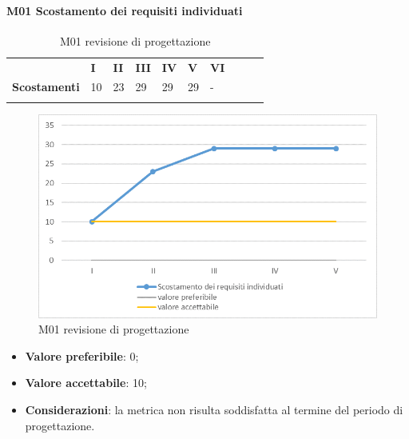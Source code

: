 \paragraph{M01 Scostamento dei requisiti individuati} \mbox{}
\begin{longtable}[H!] {						
		>{}p{50mm}  		
		>{}p{8mm}
		>{}p{8mm}		
		>{}p{8mm}		
		>{}p{8mm}		
		>{}p{8mm}		
		>{}p{8mm}
		>{}p{8mm}
		>{}p{8mm}
		>{}p{8mm}
	}
\rowcolor{gray!50}
\textbf{} & \textbf{I} & \textbf{II} & \textbf{III} & \textbf{IV} & \textbf{V} & \textbf{VI} \TBstrut \\ [2mm]
\textbf{Scostamenti} & 10 & 23 & 29 & 29 & 29 & - \TBstrut \\ [2mm]
	\rowcolor{white}
\caption{M01 revisione di progettazione}
\end{longtable}
\begin{figure}[H] 	
\includegraphics[width=\linewidth]{./img/grafici/RP1.png}	
\caption{M01 revisione di progettazione}	
\end{figure}
\begin{itemize}
	\item \textbf{Valore preferibile}: 0;
	\item \textbf{Valore accettabile}: 10;
	\item \textbf{Considerazioni}: la metrica non risulta soddisfatta al termine del periodo di progettazione.
\end{itemize}
